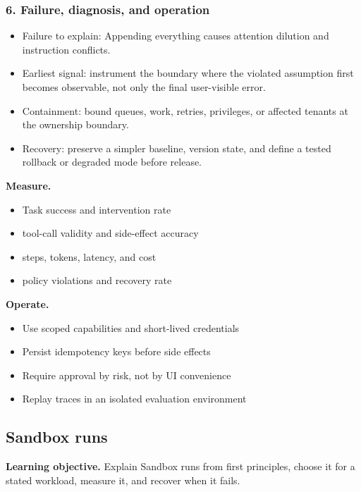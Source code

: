 \subsubsection*{6. Failure, diagnosis, and operation}
\begin{itemize}
\item Failure to explain: Appending everything causes attention dilution and instruction conflicts.
\item Earliest signal: instrument the boundary where the violated assumption first becomes observable, not only the final user-visible error.
\item Containment: bound queues, work, retries, privileges, or affected tenants at the ownership boundary.
\item Recovery: preserve a simpler baseline, version state, and define a tested rollback or degraded mode before release.
\end{itemize}
\textbf{Measure.}\begin{itemize}
\item Task success and intervention rate
\item tool-call validity and side-effect accuracy
\item steps, tokens, latency, and cost
\item policy violations and recovery rate
\end{itemize}
\textbf{Operate.}\begin{itemize}
\item Use scoped capabilities and short-lived credentials
\item Persist idempotency keys before side effects
\item Require approval by risk, not by UI convenience
\item Replay traces in an isolated evaluation environment
\end{itemize}
\subsection{Sandbox runs}
\textbf{Learning objective.} Explain Sandbox runs from first principles, choose it for a stated workload, measure it, and recover when it fails.
